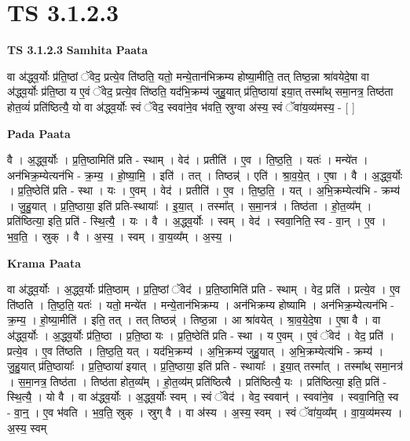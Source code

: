 \documentclass[17pt]{extarticle}
\begin{document}
\section{ TS 3.1.2.3 }

\textbf{TS 3.1.2.3 } \newline
\textbf{Samhita Paata} \newline

वा अ॑द्ध्व॒र्योः प्र॑ति॒ष्ठां ॅवेद॒ प्रत्ये॒व ति॑ष्ठति॒ यतो॒ मन्ये॒तान॑भिक्रम्य होष्या॒मीति॒ तत् तिष्ठ॒न्ना श्रा॑वयेदे॒षा वा अ॑द्ध्व॒र्योः प्र॑ति॒ष्ठा य ए॒वं ॅवेद॒ प्रत्ये॒व ति॑ष्ठति॒ यद॑भि॒क्रम्य॑ जुहु॒यात् प्र॑ति॒ष्ठाया॑ इया॒त् तस्मा᳚थ् समा॒नत्र॒ तिष्ठ॑ता होत॒व्यं॑ प्रति॑ष्ठित्यै॒ यो वा अ॑द्ध्व॒र्योः स्वं ॅवेद॒ स्ववा॑ने॒व भ॑वति॒ स्रुग्वा अ॑स्य॒ स्वं ॅवा॑य॒व्य॑मस्य॒ - [  ] \newline

\textbf{Pada Paata} \newline

वै । अ॒द्ध्व॒र्योः । प्र॒ति॒ष्ठामिति॑ प्रति - स्थाम् । वेद॑ । प्रतीति॑ । ए॒व । ति॒ष्ठ॒ति॒ । यतः॑ । मन्ये॑त । अन॑भिक्र॒म्येत्यन॑भि - क्र॒म्य॒ । हो॒ष्या॒मि॒ । इति॑ । तत् । तिष्ठन्न्॑ । एति॑ । श्रा॒व॒ये॒त् । ए॒षा । वै । अ॒द्ध्व॒र्योः । प्र॒ति॒ष्ठेति॑ प्रति - स्था । यः । ए॒वम् । वेद॑ । प्रतीति॑ । ए॒व । ति॒ष्ठ॒ति॒ । यत् । अ॒भि॒क्रम्येत्य॑भि - क्रम्य॑ । जु॒हु॒यात् । प्र॒ति॒ष्ठाया॒ इति॑ प्रति-स्थायाः᳚ । इ॒या॒त् । तस्मा᳚त् । स॒मा॒नत्र॑ । तिष्ठ॑ता । हो॒त॒व्य᳚म् । प्रति॑ष्ठित्या॒ इति॒ प्रति॑ - स्थि॒त्यै॒ । यः । वै । अ॒द्ध्व॒र्योः । स्वम् । वेद॑ । स्ववा॒निति॒ स्व - वा॒न् । ए॒व । भ॒व॒ति॒ । स्रुक् । वै । अ॒स्य॒ । स्वम् । वा॒य॒व्य᳚म् । अ॒स्य॒ ।  \newline


\textbf{Krama Paata} \newline

वा अ॑द्ध्व॒र्योः । अ॒द्ध्व॒र्योः प्र॑ति॒ष्ठाम् । प्र॒ति॒ष्ठां ॅवेद॑ । प्र॒ति॒ष्ठामिति॑ प्रति - स्थाम् । वेद॒ प्रति॑ । प्रत्ये॒व । ए॒व ति॑ष्ठति । ति॒ष्ठ॒ति॒ यतः॑ । यतो॒ मन्ये॑त । मन्ये॒तान॑भिक्रम्य । अन॑भिक्रम्य होष्यामि । अन॑भिक्र॒म्येत्यन॑भि - क्र॒म्य॒ । हो॒ष्या॒मीति॑ । इति॒ तत् ।
 तत् तिष्ठन्न्॑ । तिष्ठ॒न्ना । आ श्रा॑वयेत् । श्रा॒व॒ये॒दे॒षा । ए॒षा वै । वा अ॑द्ध्व॒र्योः । अ॒द्ध्व॒र्योः प्र॑ति॒ष्ठा । प्र॒ति॒ष्ठा यः । प्र॒ति॒ष्ठेति॑ प्रति - स्था । य ए॒वम् । ए॒वं ॅवेद॑ । वेद॒ प्रति॑ । प्रत्ये॒व । ए॒व ति॑ष्ठति । ति॒ष्ठ॒ति॒ यत् । यद॑भि॒क्रम्य॑ । अ॒भि॒क्रम्य॑ जुहु॒यात् । अ॒भि॒क्रम्येत्य॑भि - क्रम्य॑ । जु॒हु॒यात् प्र॑ति॒ष्ठायाः᳚ । प्र॒ति॒ष्ठाया॑ इयात् । प्र॒ति॒ष्ठाया॒ इति॑ प्रति - स्थायाः᳚ । इ॒या॒त् तस्मा᳚त् । तस्मा᳚थ् समा॒नत्र॑ । स॒मा॒नत्र॒ तिष्ठ॑ता । तिष्ठ॑ता होत॒व्य᳚म् । हो॒त॒व्य॑म् प्रति॑ष्ठित्यै । प्रति॑ष्ठित्यै॒ यः । प्रति॑ष्ठित्या॒ इति॒ प्रति॑ - स्थि॒त्यै॒ । यो वै । वा अ॑द्ध्व॒र्योः । अ॒द्ध्व॒र्योः स्वम् । स्वं ॅवेद॑ । वेद॒ स्ववान्॑ । स्ववा॑ने॒व । स्ववा॒निति॒ स्व - वा॒न्॒ । ए॒व भ॑वति । भ॒व॒ति॒ स्रुक् । स्रुग् वै । वा अ॑स्य । अ॒स्य॒ स्वम् । स्वं ॅवा॑य॒व्य᳚म् । वा॒य॒व्य॑मस्य । अ॒स्य॒ स्वम् \newline
\end{document}
